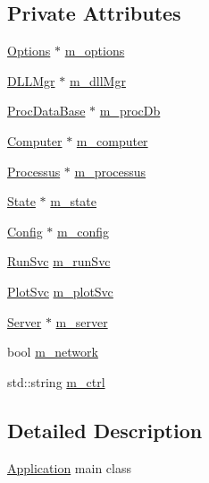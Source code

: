 \subsection*{Private Attributes}
\begin{DoxyCompactItemize}
\item 
\hyperlink{classOptions}{Options} $\ast$ \hyperlink{classApplication_a3b0c74bf1ba99a5042990e3fefaa8963}{m\_\-options}
\item 
\hyperlink{classDLLMgr}{DLLMgr} $\ast$ \hyperlink{classApplication_a66b06cbeb824fe00ecd11499fcf01c55}{m\_\-dllMgr}
\item 
\hyperlink{classProcDataBase}{ProcDataBase} $\ast$ \hyperlink{classApplication_af030cefeb69586f01e965606d5dd8919}{m\_\-procDb}
\item 
\hyperlink{classComputer}{Computer} $\ast$ \hyperlink{classApplication_a17c9fd27b6abbc18abb6d5de5d7648ef}{m\_\-computer}
\item 
\hyperlink{classProcessus}{Processus} $\ast$ \hyperlink{classApplication_ab5eb4b3d3bef5ab9fce9c69401ce5786}{m\_\-processus}
\item 
\hyperlink{classState}{State} $\ast$ \hyperlink{classApplication_a0ef9832e2d286716e597a1ff21ffcab4}{m\_\-state}
\item 
\hyperlink{classConfig}{Config} $\ast$ \hyperlink{classApplication_ae05f3e253ea871a194c3d30fd1d3b0c3}{m\_\-config}
\item 
\hyperlink{Application_8h_a02543eefd1c736af059bd210990f1dc7}{RunSvc} \hyperlink{classApplication_ad2c061af424280151c86b9b56d9724d3}{m\_\-runSvc}
\item 
\hyperlink{Application_8h_a0d7d6b8670c377909b819ba8396d2871}{PlotSvc} \hyperlink{classApplication_a30d5600ea5e4f36b14f25f903ee3256e}{m\_\-plotSvc}
\item 
\hyperlink{classServer}{Server} $\ast$ \hyperlink{classApplication_a5e6085b0f322d5036177b16113a75b56}{m\_\-server}
\item 
bool \hyperlink{classApplication_a7dc2bb72356cd9186eaad49eb506995a}{m\_\-network}
\item 
std::string \hyperlink{classApplication_aa371ed989ed34038df400c4d1b41b37f}{m\_\-ctrl}
\end{DoxyCompactItemize}


\subsection{Detailed Description}
\hyperlink{classApplication}{Application} main class

